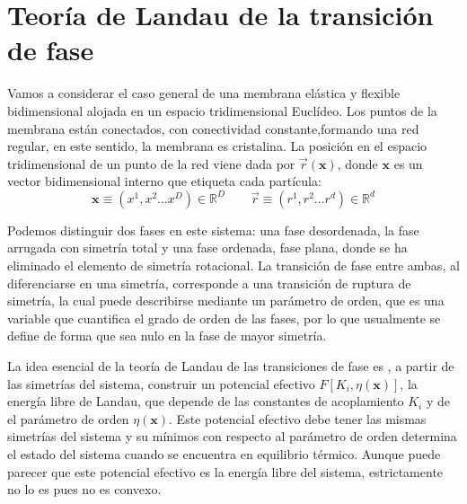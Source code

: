 \chapter{Teoría de Landau de la transición de fase}

Vamos a considerar el caso general de una membrana elástica y flexible
bidimensional alojada en un espacio tridimensional Euclídeo. Los puntos
de la membrana están conectados, con conectividad constante,formando una red
regular, en este 
sentido, la membrana es cristalina. La posición en el espacio tridimensional
de un punto de la red viene dada por $\vec{r}(\mathbf{x})$, donde $\mathbf{x}$
es un vector bidimensional interno que etiqueta cada partícula:
$$\mathbf{x}\equiv (x^1,x^2 \dots x^D)\in \mathbb{R}^D \qquad \vec{r}\equiv
(r^1,r^2 \dots r^d)\in \mathbb{R}^d$$

\begin{figure}[h]
\centering
{}
\quad
{}
\end{figure}

Podemos distinguir dos fases en este sistema: una fase desordenada, la fase
arrugada con simetría total y una fase ordenada, fase plana, donde se ha
eliminado el elemento de simetría rotacional. La transición de
fase entre ambas, al diferenciarse en una simetría, corresponde a una
transición de ruptura de simetría, la cual puede describirse mediante un
parámetro de orden, que es una variable que cuantifica el grado de orden de
las fases, por lo que usualmente se define de forma que sea nulo en la fase
de mayor simetría.

\begin{figure}[h]
\centering
{}
\quad
{}
\end{figure}


La idea esencial de la teoría de Landau de las transiciones de fase es
, a partir de las simetrías del sistema, construir un potencial efectivo
$F[K_i,\eta(\mathbf{x})]$, la energía libre de 
Landau, que depende de las constantes de acoplamiento $K_i$ y de el parámetro
de orden $\eta(\mathbf{x})$. Este potencial efectivo debe tener las mismas
simetrías del 
sistema y su mínimos con respecto al parámetro de orden determina el estado
del sistema cuando se encuentra en equilibrio térmico. Aunque puede parecer
que este potencial efectivo es la energía libre del sistema, estrictamente no
lo es pues no es convexo.

